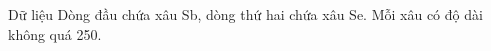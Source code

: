 Dữ liệu
Dòng đầu chứa xâu Sb, dòng thứ hai chứa xâu Se. Mỗi xâu có độ dài không quá 250.